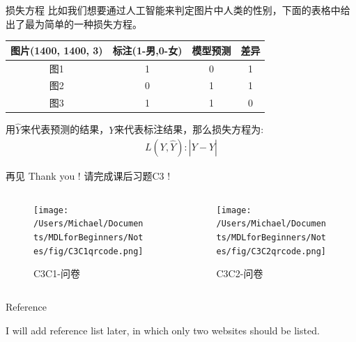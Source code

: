 \documentclass[handout]{beamer}
\begin{document}
\begin{frame}{损失方程}
比如我们想要通过人工智能来判定图片中人类的性别，下面的表格中给出了最为简单的一种损失方程。
\begin{table}[H]
	\centering
	\renewcommand{\arraystretch}{1.5}
	\begin{tabular}{cccc}
	\hline 
		图片(1400, 1400, 3) & 标注(1-男,0-女) & 模型预测 & 差异\\
		\hline 
		图1 & 1 & 0 & 1 \\
		图2 & 0 & 1 & 1 \\
		图3 & 1 & 1 & 0 \\
		\hline 
	\end{tabular}
\end{table}
用$\hat{Y}$来代表预测的结果，$Y$来代表标注结果，那么损失方程为:
\begin{align*}
	L(Y, \hat{Y}): |Y-\hat{Y}| 
\end{align*}
\end{frame}






\begin{frame}{再见}
	Thank you !  请完成课后习题C3 !
\begin{columns}
	\begin{column}{0.4\textwidth}
			\begin{figure}[H]
				\centering
			\texttt{[image: /Users/Michael/Documents/MDLforBeginners/Notes/fig/C3C1qrcode.png]}
			\caption{C3C1-问卷}
			\end{figure}
	\end{column}
	\begin{column}{0.4\textwidth}
		\begin{figure}[H]
	\texttt{[image: /Users/Michael/Documents/MDLforBeginners/Notes/fig/C3C2qrcode.png]}
	\caption{C3C2-问卷}
\end{figure}	
	\end{column}
\end{columns}
\end{frame}



\begin{frame}[allowframebreaks]{Reference}
  
  
  I will add reference list later, in which only two websites should be listed. 
\end{frame}
\end{document}
